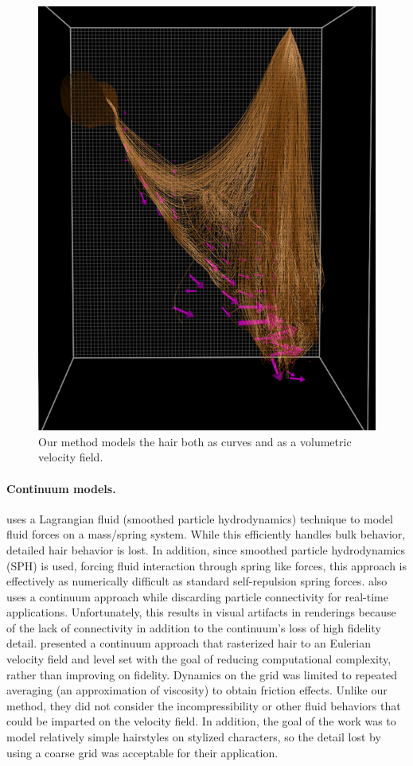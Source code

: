 \begin{figure}[t!]
  \centering
\includegraphics[width = .4\columnwidth]{hair/images/viz/together-15}
  \caption[Hair as curves and continuum.]{\label{fig:viz} Our method models the hair both as curves
    and as a volumetric velocity field.}
\end{figure}

\paragraph{Continuum models.}  \cite{hadap:2001:continuum-hair} uses a Lagrangian
fluid (smoothed particle hydrodynamics) technique to model fluid forces on a
mass/spring system. While this efficiently handles bulk behavior, detailed hair
behavior is lost. In addition, since smoothed particle hydrodynamics (SPH) is
used, forcing fluid interaction through spring like forces, this approach is
effectively as numerically difficult as standard self-repulsion spring forces.
\cite{bando:2003:hair-loosely-connected-particles} also uses a continuum
approach while discarding particle connectivity for real-time
applications. Unfortunately, this results in visual artifacts in renderings
because of the lack of connectivity in addition to the continuum's loss of high
fidelity detail.  \cite{petrovic:2005:levelset-hair} presented a continuum
approach that rasterized hair to an Eulerian velocity field and level set with
the goal of reducing computational complexity, rather than improving on
fidelity. Dynamics on the grid was limited to repeated averaging (an
approximation of viscosity) to obtain friction effects. Unlike our method,
they did not consider the incompressibility or other fluid behaviors that could
be imparted on the velocity field. In addition, the goal of the work was to
model relatively simple hairstyles on stylized characters, so the detail lost by
using a coarse grid was acceptable for their application.

